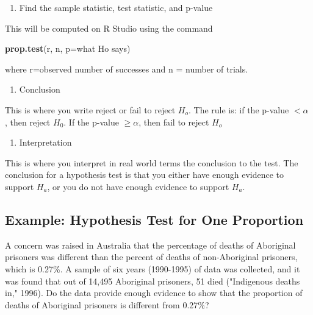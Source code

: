 \documentclass[
]{book}
\newenvironment{Shaded}{\begin{snugshade}}{\end{snugshade}}
\newcommand{\DataTypeTok}[1]{\textcolor[rgb]{0.13,0.29,0.53}{#1}}
\newcommand{\KeywordTok}[1]{\textcolor[rgb]{0.13,0.29,0.53}{\textbf{#1}}}
\newcommand{\NormalTok}[1]{#1}
\providecommand{\tightlist}{%
  \setlength{\itemsep}{0pt}\setlength{\parskip}{0pt}}
\begin{document}
\begin{enumerate}
\def\labelenumi{\arabic{enumi}.}
\setcounter{enumi}{3}
\tightlist
\item
  Find the sample statistic, test statistic, and p-value
\end{enumerate}

This will be computed on R Studio using the command

\begin{Shaded}
\begin{Highlighting}[]
\KeywordTok{prop.test}\NormalTok{(r, n, }\DataTypeTok{p=}\NormalTok{what Ho says)}
\end{Highlighting}
\end{Shaded}

where r=observed number of successes and n = number of trials.

\begin{enumerate}
\def\labelenumi{\arabic{enumi}.}
\setcounter{enumi}{4}
\tightlist
\item
  Conclusion
\end{enumerate}

This is where you write reject or fail to reject \(H_o\). The rule is: if the p-value \(<\alpha\) , then reject \(H_0\). If the p-value \(\ge\alpha\), then fail to reject \(H_o\)

\begin{enumerate}
\def\labelenumi{\arabic{enumi}.}
\setcounter{enumi}{5}
\tightlist
\item
  Interpretation
\end{enumerate}

This is where you interpret in real world terms the conclusion to the test. The conclusion for a hypothesis test is that you either have enough evidence to support \(H_a\), or you do not have enough evidence to support \(H_a\).

\hypertarget{example-hypothesis-test-for-one-proportion}{%
\subsection{Example: Hypothesis Test for One Proportion}\label{example-hypothesis-test-for-one-proportion}}

A concern was raised in Australia that the percentage of deaths of Aboriginal prisoners was different than the percent of deaths of non-Aboriginal prisoners, which is 0.27\%. A sample of six years (1990-1995) of data was collected, and it was found that out of 14,495 Aboriginal prisoners, 51 died ("Indigenous deaths in," 1996). Do the data provide enough evidence to show that the proportion of deaths of Aboriginal prisoners is different from 0.27\%?
\end{document}
